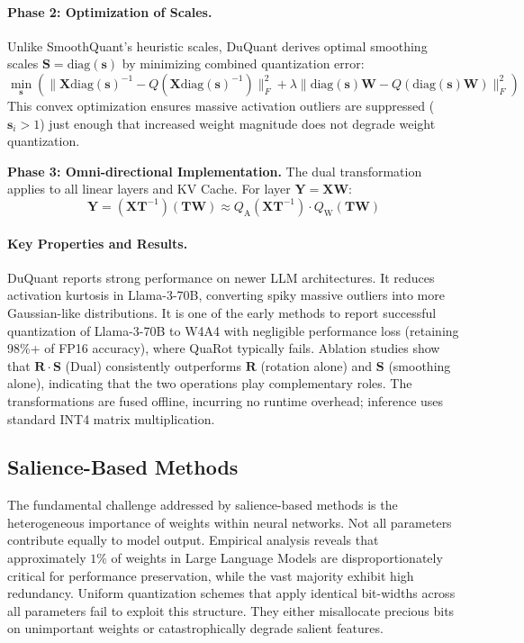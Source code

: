 \paragraph{Phase 2: Optimization of Scales.}
Unlike SmoothQuant's heuristic scales, DuQuant derives optimal smoothing scales $\bm{S} = \text{diag}(\bm{s})$ by minimizing combined quantization error:
\begin{equation}
\min_{\bm{s}} \left( \|\bm{X}\text{diag}(\bm{s})^{-1} - Q(\bm{X}\text{diag}(\bm{s})^{-1})\|_F^2 + \lambda \|\text{diag}(\bm{s})\bm{W} - Q(\text{diag}(\bm{s})\bm{W})\|_F^2 \right)
\end{equation}
This convex optimization ensures massive activation outliers are suppressed ($\bm{s}_i > 1$) just enough that increased weight magnitude does not degrade weight quantization.

\textbf{Phase 3: Omni-directional Implementation.} The dual transformation applies to all linear layers and KV Cache. For layer $\bm{Y} = \bm{X}\bm{W}$:
\begin{equation}
  \bm{Y} = (\bm{X}\bm{T}^{-1}) (\bm{T}\bm{W}) \approx Q_{\text{A}}(\bm{X}\bm{T}^{-1}) \cdot Q_{\text{W}}(\bm{T}\bm{W})
\end{equation}

\paragraph{Key Properties and Results.}
DuQuant reports strong performance on newer LLM architectures. It reduces activation kurtosis in Llama-3-70B, converting spiky massive outliers into more Gaussian-like distributions. It is one of the early methods to report successful quantization of Llama-3-70B to W4A4 with negligible performance loss (retaining 98\%+ of FP16 accuracy), where QuaRot typically fails. Ablation studies show that $\bm{R} \cdot \bm{S}$ (Dual) consistently outperforms $\bm{R}$ (rotation alone) and $\bm{S}$ (smoothing alone), indicating that the two operations play complementary roles. The transformations are fused offline, incurring no runtime overhead; inference uses standard INT4 matrix multiplication.

\subsection{Salience-Based Methods}

The fundamental challenge addressed by salience-based methods is the heterogeneous importance of weights within neural networks. Not all parameters contribute equally to model output. Empirical analysis reveals that approximately $1\%$ of weights in Large Language Models are disproportionately critical for performance preservation, while the vast majority exhibit high redundancy. Uniform quantization schemes that apply identical bit-widths across all parameters fail to exploit this structure. They either misallocate precious bits on unimportant weights or catastrophically degrade salient features.

